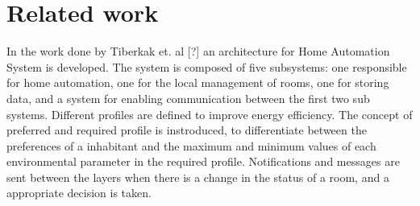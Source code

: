 \section{Related work}
In the work done by Tiberkak et. al [?] an architecture for Home Automation
System is developed. The system is composed of five subsystems: one responsible
for home automation, one for the local management of rooms, one
for storing data, and a system for enabling communication between the first
two sub systems. Different profiles are defined to improve energy efficiency.
The concept of preferred and required profile is instroduced, to differentiate
between the preferences of a inhabitant and the maximum and minimum values
of each environmental parameter in the required profile. Notifications
and messages are sent between the layers when there is a change in the
status of a room, and a appropriate decision is taken.